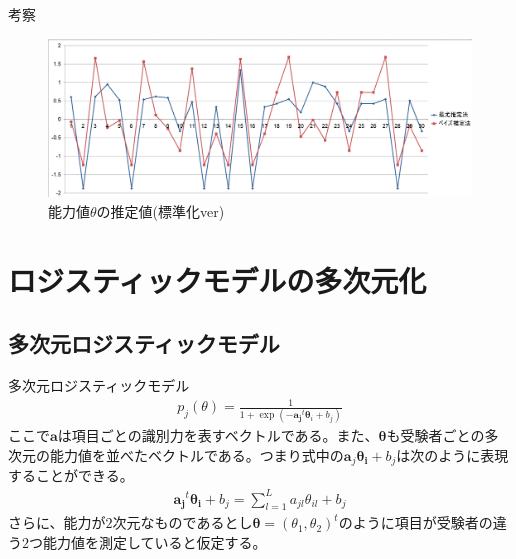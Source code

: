 \documentclass[aspectratio=169, dvipdfmx, 12pt]{beamer}
\begin{document}
\begin{frame}
  \begin{block}{考察}
    \vspace{4.5cm}
    \begin{figure}[H]
      \centering
      \includegraphics[bb = 1200 100 1 1,scale = 0.3]{saiyubay.png}
      \vspace{1cm}
      \caption{能力値$\theta$の推定値(標準化ver)}
    \end{figure}
  \end{block}
\end{frame}
\section{ロジスティックモデルの多次元化}
\subsection{多次元ロジスティックモデル}
\begin{frame}
  \begin{block}{多次元ロジスティックモデル}
    \begin{align}
      \displaystyle
      \label{4.1}
      p_j(\theta) = \frac{1}{1 + \exp(-\boldsymbol{{a}_j}^t \boldsymbol{\theta}_i + b_j)}
    \end{align}
    ここで$\boldsymbol{a}$は項目ごとの識別力を表すベクトルである。また、$\boldsymbol{\theta}$も受験者ごとの多次元の能力値を並べたベクトルである。つまり式中の$\boldsymbol{a}_j \boldsymbol{\theta_i} + b_j$は次のように表現することができる。
    \begin{align}
      \displaystyle
      \boldsymbol{{a}_j}^t \boldsymbol{\theta_i} + b_j = \sum_{l = 1}^{L} {a_{jl}}\theta_{il} + b_j
    \end{align}
    さらに、能力が$2$次元なものであるとし$\boldsymbol{\theta} = (\theta_1,\theta_2)^t$のように項目が受験者の違う$2$つ能力値を測定していると仮定する。
  \end{block}
\end{frame}
\end{document}
